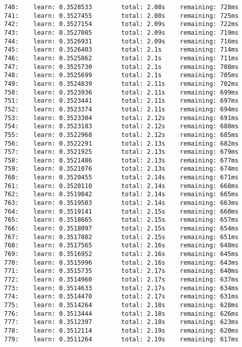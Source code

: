 \documentclass[11pt]{article}
\begin{document}
\begin{Verbatim}[commandchars=\\\{\}]
740:    learn: 0.3528533        total: 2.08s    remaining: 728ms
741:    learn: 0.3527455        total: 2.08s    remaining: 725ms
742:    learn: 0.3527154        total: 2.09s    remaining: 722ms
743:    learn: 0.3527085        total: 2.09s    remaining: 719ms
744:    learn: 0.3526931        total: 2.09s    remaining: 716ms
745:    learn: 0.3526403        total: 2.1s     remaining: 714ms
746:    learn: 0.3525862        total: 2.1s     remaining: 711ms
747:    learn: 0.3525730        total: 2.1s     remaining: 708ms
748:    learn: 0.3525699        total: 2.1s     remaining: 705ms
749:    learn: 0.3524839        total: 2.11s    remaining: 702ms
750:    learn: 0.3523936        total: 2.11s    remaining: 699ms
751:    learn: 0.3523441        total: 2.11s    remaining: 697ms
752:    learn: 0.3523374        total: 2.11s    remaining: 694ms
753:    learn: 0.3523304        total: 2.12s    remaining: 691ms
754:    learn: 0.3523183        total: 2.12s    remaining: 688ms
755:    learn: 0.3522968        total: 2.12s    remaining: 685ms
756:    learn: 0.3522291        total: 2.13s    remaining: 682ms
757:    learn: 0.3521925        total: 2.13s    remaining: 679ms
758:    learn: 0.3521486        total: 2.13s    remaining: 677ms
759:    learn: 0.3521076        total: 2.13s    remaining: 674ms
760:    learn: 0.3520455        total: 2.14s    remaining: 671ms
761:    learn: 0.3520110        total: 2.14s    remaining: 668ms
762:    learn: 0.3519842        total: 2.14s    remaining: 665ms
763:    learn: 0.3519503        total: 2.14s    remaining: 663ms
764:    learn: 0.3519141        total: 2.15s    remaining: 660ms
765:    learn: 0.3518665        total: 2.15s    remaining: 657ms
766:    learn: 0.3518097        total: 2.15s    remaining: 654ms
767:    learn: 0.3517882        total: 2.15s    remaining: 651ms
768:    learn: 0.3517565        total: 2.16s    remaining: 648ms
769:    learn: 0.3516952        total: 2.16s    remaining: 645ms
770:    learn: 0.3515996        total: 2.16s    remaining: 643ms
771:    learn: 0.3515735        total: 2.17s    remaining: 640ms
772:    learn: 0.3514960        total: 2.17s    remaining: 637ms
773:    learn: 0.3514633        total: 2.17s    remaining: 634ms
774:    learn: 0.3514470        total: 2.17s    remaining: 631ms
775:    learn: 0.3514264        total: 2.18s    remaining: 628ms
776:    learn: 0.3513444        total: 2.18s    remaining: 626ms
777:    learn: 0.3512397        total: 2.18s    remaining: 623ms
778:    learn: 0.3512114        total: 2.19s    remaining: 620ms
779:    learn: 0.3511264        total: 2.19s    remaining: 617ms

\end{Verbatim}
\end{document}
